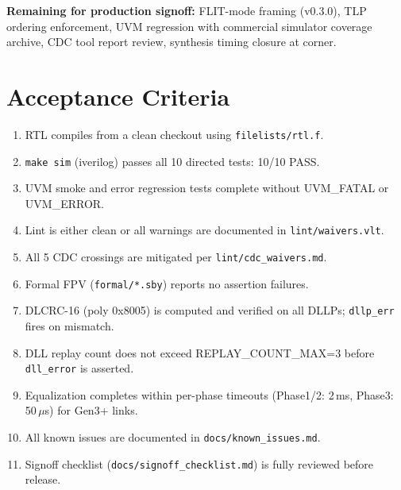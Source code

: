 \documentclass[11pt,a4paper]{article}
\begin{document}
\vspace{4mm}
\noindent\textbf{Remaining for production signoff:} FLIT-mode framing (v0.3.0), TLP ordering
enforcement, UVM regression with commercial simulator coverage archive, CDC tool
report review, synthesis timing closure at corner.

\section*{Acceptance Criteria}

\begin{enumerate}[noitemsep]
  \item RTL compiles from a clean checkout using \texttt{filelists/rtl.f}.
  \item \texttt{make sim} (iverilog) passes all 10 directed tests: 10/10 PASS.
  \item UVM smoke and error regression tests complete without UVM\_FATAL or UVM\_ERROR.
  \item Lint is either clean or all warnings are documented in \texttt{lint/waivers.vlt}.
  \item All 5 CDC crossings are mitigated per \texttt{lint/cdc\_waivers.md}.
  \item Formal FPV (\texttt{formal/*.sby}) reports no assertion failures.
  \item DLCRC-16 (poly 0x8005) is computed and verified on all DLLPs; \texttt{dllp\_err} fires on mismatch.
  \item DLL replay count does not exceed REPLAY\_COUNT\_MAX=3 before \texttt{dll\_error} is asserted.
  \item Equalization completes within per-phase timeouts (Phase1/2: 2\,ms, Phase3: 50\,$\mu$s) for Gen3+ links.
  \item All known issues are documented in \texttt{docs/known\_issues.md}.
  \item Signoff checklist (\texttt{docs/signoff\_checklist.md}) is fully reviewed before release.
\end{enumerate}
\end{document}
